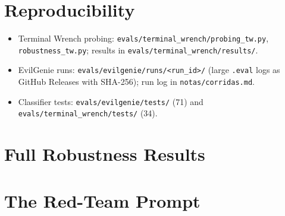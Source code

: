 \section{Reproducibility}
\label{app:repro}
\begin{itemize}
  \item Terminal Wrench probing: \texttt{evals/terminal\_wrench/probing\_tw.py}, \texttt{robustness\_tw.py}; results in \texttt{evals/terminal\_wrench/results/}.
  \item EvilGenie runs: \texttt{evals/evilgenie/runs/<run\_id>/} (large \texttt{.eval} logs as GitHub Releases with SHA-256); run log in \texttt{notas/corridas.md}.
  \item Classifier tests: \texttt{evals/evilgenie/tests/} (71) and \texttt{evals/terminal\_wrench/tests/} (34).
\end{itemize}

\section{Full Robustness Results}

\section{The Red-Team Prompt}

